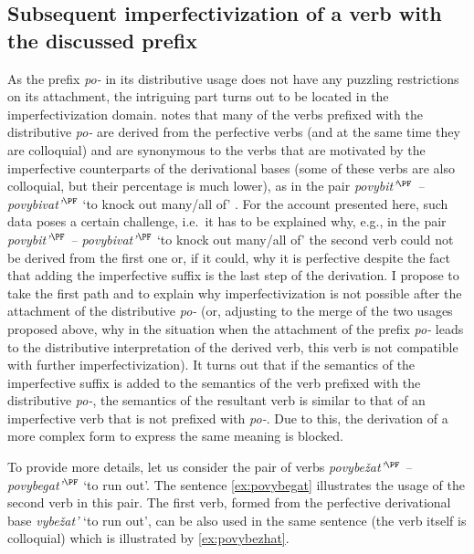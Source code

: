 \subsection{Subsequent imperfectivization of a verb with the discussed prefix}
As the prefix \textit{po-} in its distributive usage does not have any puzzling restrictions on its attachment, the intriguing part turns out to be located in the imperfectivization domain. \citet[365]{Shvedova:82} notes that many of the verbs prefixed with the distributive \textit{po-} are derived from the perfective verbs (and at the same time they are colloquial) and are synonymous to the verbs that are motivated by the imperfective counterparts of the derivational bases (some of these verbs are also colloquial, but their percentage is much lower), as in the pair \textit{povybit'$^{\PF}$ -- povybivat'$^{\PF}$} `to knock out many/all of'
.
For the account presented here, such data poses a certain challenge, i.e.\ it has to be explained why, e.g., in the pair \textit{povybit'$^{\PF}$ -- povybivat'$^{\PF}$} `to knock out many/all of' the second verb could not be derived from the first one or, if it could, why it is perfective despite the fact that adding the imperfective suffix is the last step of the derivation. I propose to take the first path and to explain why imperfectivization is not possible after the attachment of the distributive \textit{po-} (or, adjusting to the merge of the two usages proposed above, why in the situation when the attachment of the prefix \textit{po-} leads to the distributive interpretation of the derived verb, this verb is not compatible with further imperfectivization). It turns out that if the semantics of the imperfective suffix is added to the semantics of the verb prefixed with the distributive \textit{po-}, the semantics of the resultant verb is similar to that of an imperfective verb that is not prefixed with \textit{po-}. Due to this, the derivation of a more complex form to express the same meaning is blocked.

To provide more details, let us consider the pair of verbs \textit{povybe\v{z}at'$^{\PF}$ -- po\-vy\-be\-gat'$^{\PF}$} `to run out'. The sentence \ref{ex:povybegat} illustrates the usage of the second verb in this pair. The first verb, formed from the perfective derivational base \textit{vybe\v{z}at'} `to run out', can be also used in the same sentence (the verb itself is colloquial) which is illustrated by \ref{ex:povybezhat}.

